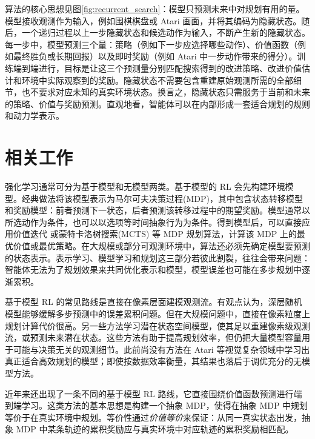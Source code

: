 \documentclass{article}
\begin{document}
算法的核心思想见图\ref{fig:recurrent_search}：模型只预测未来中对规划有用的量。模型接收观测作为输入，例如围棋棋盘或 Atari 画面，并将其编码为隐藏状态。随后，一个递归过程以上一步隐藏状态和候选动作为输入，不断产生新的隐藏状态。每一步中，模型预测三个量：策略（例如下一步应选择哪些动作）、价值函数（例如最终胜负或长期回报）以及即时奖励（例如 Atari 中一步动作带来的得分）。训练端到端进行，目标是让这三个预测量分别匹配搜索得到的改进策略、改进价值估计和环境中实际观察到的奖励。隐藏状态不需要包含重建原始观测所需的全部细节，也不要求对应未知的真实环境状态。换言之，隐藏状态只需服务于当前和未来的策略、价值与奖励预测。直观地看，智能体可以在内部形成一套适合规划的规则和动力学表示。

\section{相关工作}

强化学习通常可分为基于模型和无模型两类\cite{sutton:book}。基于模型的 RL 会先构建环境模型。经典做法将该模型表示为马尔可夫决策过程(MDP)\cite{puterman:MDP}，其中包含状态转移模型和奖励模型：前者预测下一状态，后者预测该转移过程中的期望奖励。模型通常以所选动作为条件，也可以以选项等时间抽象行为为条件\cite{sutton:between}。得到模型后，可以直接应用价值迭代\cite{puterman:MDP} 或蒙特卡洛树搜索(MCTS)\cite{coulom:mcts} 等 MDP 规划算法，计算该 MDP 上的最优价值或最优策略。在大规模或部分可观测环境中，算法还必须先确定模型要预测的状态表示。表示学习、模型学习和规划这三部分若彼此割裂，往往会带来问题：智能体无法为了规划效果来共同优化表示和模型，模型误差也可能在多步规划中逐渐累积。

基于模型 RL 的常见路线是直接在像素层面建模观测流。有观点认为，深层随机模型能够缓解多步预测中的误差累积问题\cite{hafner:planet, kaiser:simple}。但在大规模问题中，直接在像素粒度上规划计算代价很高。另一些方法学习潜在状态空间模型，使其足以重建像素级观测流\cite{wahlstrom:pixels_to_torques,watter:embed_to_control}，或预测未来潜在状态\cite{ha:world_model,gelada:deepmdp}。这些方法有助于提高规划效率，但仍把大量模型容量用于可能与决策无关的观测细节。此前尚没有方法在 Atari 等视觉复杂领域中学习出真正适合高效规划的模型；即使按数据效率衡量，其结果也落后于调优充分的无模型方法\cite{hado:replay}。

近年来还出现了一条不同的基于模型 RL 路线，它直接围绕价值函数预测进行端到端学习\cite{silver:predictron}。这类方法的基本思想是构建一个抽象 MDP，使得在抽象 MDP 中规划等价于在真实环境中规划。等价性通过\emph{价值等价}来保证：从同一真实状态出发，抽象 MDP 中某条轨迹的累积奖励应与真实环境中对应轨迹的累积奖励相匹配。
\end{document}
